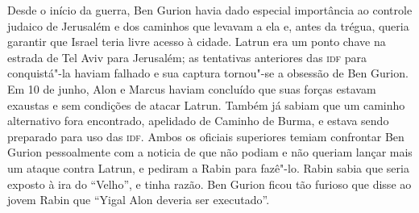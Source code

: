 Desde o início da guerra, Ben Gurion havia dado especial importância ao
controle judaico de Jerusalém e dos caminhos que levavam a ela e, antes
da trégua, queria garantir que Israel teria livre acesso à cidade. Latrun
era um ponto chave na estrada de Tel Aviv para Jerusalém; as tentativas
anteriores das \textsc{idf} para conquistá"-la haviam falhado e sua captura
tornou"-se a obsessão de Ben Gurion. Em 10 de junho, Alon e Marcus haviam
concluído que suas forças estavam exaustas e sem condições de
atacar Latrun. Também já sabiam que um caminho alternativo fora
encontrado, apelidado de Caminho de Burma, e estava sendo preparado para
uso das \textsc{idf}. Ambos os oficiais superiores temiam confrontar Ben Gurion
pessoalmente com a noticia de que não podiam e não queriam lançar mais
um ataque contra Latrun, e pediram a Rabin para fazê"-lo. Rabin sabia que
seria exposto à ira do ``Velho'', e tinha razão. Ben Gurion ficou tão
furioso que disse ao jovem Rabin que ``Yigal Alon deveria ser
executado''.


